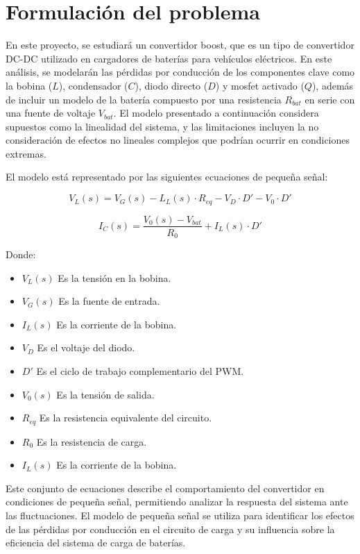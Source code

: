 \section{Formulaci\'on del problema}
\label{sec:formulacion_problema}

En este proyecto, se estudiar\'a un convertidor boost, que es un tipo de convertidor DC-DC utilizado en cargadores de bater\'ias para veh\'iculos el\'ectricos. En este an\'alisis, se modelar\'an las p\'erdidas por conducci\'on de los componentes clave como la bobina ($L$), condensador ($C$), diodo directo ($D$) y mosfet activado ($Q$), adem\'as de incluir un modelo de la bater\'ia compuesto por una resistencia $R_{bat}$ en serie con una fuente de voltaje $V_{bat}$. El modelo presentado a continuaci\'on considera supuestos como la linealidad del sistema, y las limitaciones incluyen la no consideraci\'on de efectos no lineales complejos que podr\'ian ocurrir en condiciones extremas.

El modelo est\'a representado por las siguientes ecuaciones de peque\~na se\~nal:

\[
V_L(s) = V_G(s) - L_L(s) \cdot R_{eq} - V_D \cdot D' - V_0 \cdot D'
\]

\[
I_C(s) = \frac{V_0(s) - V_{bat}}{R_0} + I_L(s) \cdot D'
\]

Donde:

\begin{itemize}
  \item $V_L(s)$ \quad \textendash\quad Es la tensi\'on en la bobina.
  \item $V_G(s)$ \quad \textendash\quad Es la fuente de entrada.
  \item $I_L(s)$ \quad \textendash\quad Es la corriente de la bobina.
  \item $V_D$ \quad \textendash\quad Es el voltaje del diodo.
  \item $D'$ \quad \textendash\quad Es el ciclo de trabajo complementario del PWM.
  \item $V_0(s)$ \quad \textendash\quad Es la tensi\'on de salida.
  \item $R_{eq}$ \quad \textendash\quad Es la resistencia equivalente del circuito.
  \item $R_0$ \quad \textendash\quad Es la resistencia de carga.
  \item $I_L(s)$ \quad \textendash\quad Es la corriente de la bobina.
\end{itemize}

Este conjunto de ecuaciones describe el comportamiento del convertidor en condiciones de peque\~na se\~nal, permitiendo analizar la respuesta del sistema ante las fluctuaciones. El modelo de peque\~na se\~nal se utiliza para identificar los efectos de las p\'erdidas por conducci\'on en el circuito de carga y su influencia sobre la eficiencia del sistema de carga de bater\'ias.

